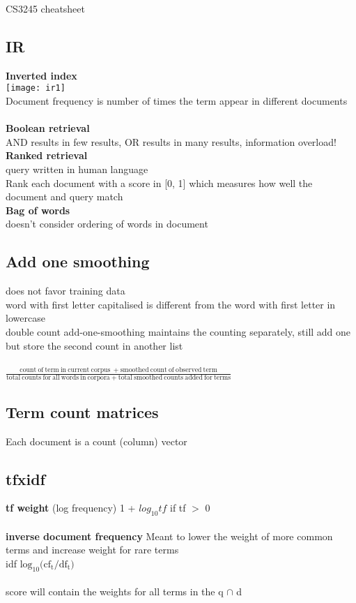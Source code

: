 \documentclass[11pt]{article}
\begin{document}
\setlength{\columnsep}{1cm}
\begin{multicols*}{3}
CS3245 cheatsheet
\subsection*{IR}
\textbf{Inverted index}\\
\texttt{[image: ir1]}\\
Document frequency is number of times the term appear in different documents
\\
\\
\textbf{Boolean retrieval}\\
AND results in few results, OR results in many results, information overload!
\\
\textbf{Ranked retrieval}\\
query written in human language
\\
Rank each document with a score in [0, 1] which measures how well the document and query match
\\
\textbf{Bag of words}\\
doesn't consider ordering of words in document

\subsection*{Add one smoothing}
does not favor training data
\\
word with first letter capitalised is different from the word with first letter in lowercase
\\
double count add-one-smoothing maintains the counting separately, still add one but store the second count in another list
\\\\
$\mathrm{\frac{ count\ of\ term\ in\ current\ corpus\ + smoothed\ count\ of\ observed\ term}{total\ counts\ for\ all\ words\ in \ corpora + total\ smoothed\ counts\ added\ for\ terms}}$
\subsection*{Term count matrices}
Each document is a count (column) vector
\\
\subsection*{tfxidf}
\textbf{tf weight} (log frequency) 1 + $log_{10}{tf}$ if tf $>$ 0 
\\\\
\textbf{inverse document frequency}
Meant to lower the weight of more common terms and increase weight for rare terms\\
idf $\mathrm{log_{10}{(cf_{t} / df_{t}})}$
\\
\\
score will contain the weights for all terms in the q $\cap$ d

\end{multicols*}
\end{document}
